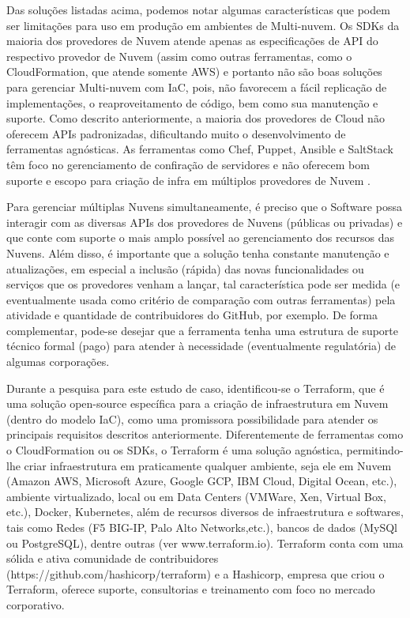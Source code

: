 \documentclass[12pt]{article}
\begin{document}
	Das soluções listadas acima, podemos notar algumas características que podem ser limitações para uso em produção em ambientes de Multi-nuvem. Os SDKs da maioria dos provedores de Nuvem atende apenas as especificações de API do respectivo provedor de Nuvem (assim como outras ferramentas, como o CloudFormation, que atende somente AWS) e portanto não são boas soluções para gerenciar Multi-nuvem com IaC, pois, não favorecem a fácil replicação de implementações, o reaproveitamento de código, bem como sua manutenção e suporte. Como descrito anteriormente, a maioria dos provedores de Cloud não oferecem APIs padronizadas, dificultando muito o desenvolvimento de ferramentas agnósticas. As ferramentas como Chef, Puppet, Ansible e SaltStack têm foco no gerenciamento de confiração de servidores e não oferecem bom suporte e escopo para criação de infra em múltiplos provedores de Nuvem \cite{Morris:2016}.
	
	Para gerenciar múltiplas Nuvens simultaneamente, é preciso que o Software possa interagir com as diversas APIs dos provedores de Nuvens (públicas ou privadas) e que conte com suporte o mais amplo possível ao gerenciamento dos recursos das Nuvens. Além disso, é importante que a solução tenha constante manutenção e atualizações, em especial a inclusão (rápida) das novas funcionalidades ou serviços que os provedores venham a lançar, tal característica pode ser medida (e eventualmente usada como critério de comparação com outras ferramentas) pela atividade e quantidade de contribuidores do GitHub, por exemplo. De forma complementar, pode-se desejar que a ferramenta tenha uma estrutura de suporte técnico formal (pago) para atender à necessidade (eventualmente regulatória) de algumas corporações.
	
	Durante a pesquisa para este estudo de caso, identificou-se o Terraform, que é uma solução open-source específica para a criação de infraestrutura em Nuvem (dentro do modelo IaC), como uma promissora possibilidade para atender os principais requisitos descritos anteriormente. Diferentemente de ferramentas como o CloudFormation ou os SDKs, o Terraform é uma solução agnóstica, permitindo-lhe criar infraestrutura em praticamente qualquer ambiente, seja ele em Nuvem (Amazon AWS, Microsoft Azure, Google GCP, IBM Cloud, Digital Ocean, etc.), ambiente virtualizado, local ou em Data Centers (VMWare, Xen, Virtual Box, etc.), Docker, Kubernetes, além de recursos diversos de infraestrutura e softwares, tais como Redes (F5 BIG-IP, Palo Alto Networks,etc.), bancos de dados (MySQl ou PostgreSQL), dentre outras (ver www.terraform.io). Terraform conta com uma sólida e ativa comunidade de contribuidores (https://github.com/hashicorp/terraform) e a Hashicorp, empresa que criou o Terraform, oferece suporte, consultorias e treinamento com foco no mercado corporativo.
	
\end{document}
